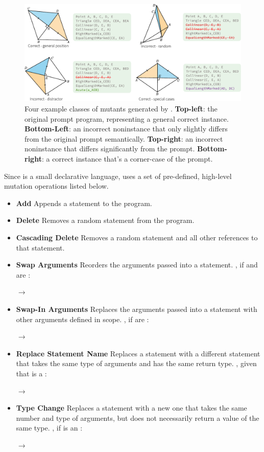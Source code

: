 \begin{figure}[h]
    \centering
    \includegraphics[width=\linewidth]{assets/chapter-3/answer-types.pdf}
    \caption{Four example classes of mutants generated by \Edgeworth. \textbf{Top-left}: the original prompt program, representing a general correct instance. \textbf{Bottom-Left}: an incorrect noninstance that only slightly differs from the original prompt semantically. \textbf{Top-right}: an incorrect noninstance that differs significantly from the prompt. \textbf{Bottom-right}: a correct instance that's a corner-case of the prompt.}
    \label{fig:answer-types}
\end{figure}

Since \Substance is a small declarative language, \Edgeworth uses a set of pre-defined, high-level mutation operations listed below. 

\begin{itemize}
    \item \textbf{Add} Appends a statement to the \Substance program.
    \item \textbf{Delete} Removes a random statement from the \Substance program.
    \item \textbf{Cascading Delete} Removes a random statement and all other references to that statement.
    \item \textbf{Swap Arguments} Reorders the arguments passed into a statement. \eg, if  and  are :
    
             $\rightarrow$ 
    \item \textbf{Swap-In Arguments} Replaces the arguments passed into a statement with other arguments defined in scope. \eg, if  are :
            
             	$\rightarrow$ 
    \item \textbf{Replace Statement Name} Replaces a statement with a different statement that takes the same type of arguments and has the same return type. \eg, given that  is a :
            
             $\rightarrow$ 
    \item \textbf{Type Change} Replaces a statement with a new one that takes the same number and type of arguments, but does not necessarily return a value of the same type. \eg, if  is an :
            
             $\rightarrow$ 
\end{itemize}

